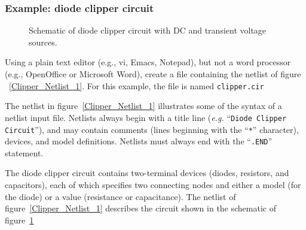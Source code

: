 \subsubsection{Example: diode clipper circuit}

\begin{figure}[H]
\begin{centering}
\caption{Schematic of diode clipper circuit with DC and transient voltage sources.\label{Clipper_Schematic}}
\end{centering}
\end{figure}

Using a plain text editor (e.g., vi, Emacs, Notepad), but not a word processor (e.g., OpenOffice or Microsoft Word), 
create a file containing the netlist of figure ~\ref{Clipper_Netlist_1}. 
For this example, the file is named \texttt{clipper.cir}

The netlist in figure~\ref{Clipper_Netlist_1} illustrates some of the 
syntax of a netlist input file.  Netlists always begin with a 
title line (\emph{e.g.\/} ``\texttt{Diode Clipper Circuit}''), and may 
contain comments (lines beginning with 
the ``\texttt{*}'' character), devices, and model definitions. Netlists must always end with the ``\texttt{.END}'' statement.

The diode clipper circuit contains two-terminal devices
(diodes, resistors, and capacitors), each of which specifies two
connecting nodes and either a model (for the diode) or a value
(resistance or capacitance).  The netlist of figure~\ref{Clipper_Netlist_1} describes the circuit shown in the schematic of figure~\ref{Clipper_Schematic}

